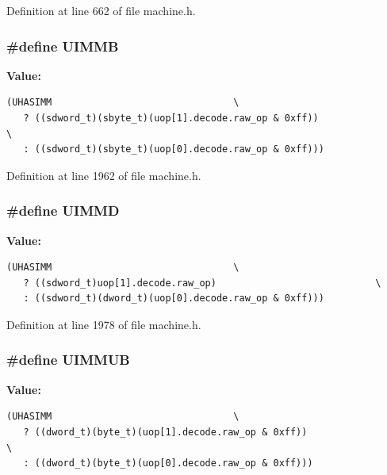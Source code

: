 Definition at line 662 of file machine.h.
\subsubsection[{UIMMB}]{\setlength{\rightskip}{0pt plus 5cm}\#define UIMMB}\label{machine_8h_27686bad12022aeba990da1a46f36e5a}


\textbf{Value:}

\begin{Code}\begin{verbatim}(UHASIMM                                \
   ? ((sdword_t)(sbyte_t)(uop[1].decode.raw_op & 0xff))                \
   : ((sdword_t)(sbyte_t)(uop[0].decode.raw_op & 0xff)))
\end{verbatim}
\end{Code}


Definition at line 1962 of file machine.h.
\subsubsection[{UIMMD}]{\setlength{\rightskip}{0pt plus 5cm}\#define UIMMD}\label{machine_8h_8a9a7eaecd779e8f7401f25b26a698ad}


\textbf{Value:}

\begin{Code}\begin{verbatim}(UHASIMM                                \
   ? ((sdword_t)uop[1].decode.raw_op)                            \
   : ((sdword_t)(dword_t)(uop[0].decode.raw_op & 0xff)))
\end{verbatim}
\end{Code}


Definition at line 1978 of file machine.h.
\subsubsection[{UIMMUB}]{\setlength{\rightskip}{0pt plus 5cm}\#define UIMMUB}\label{machine_8h_298f3ad34dbf1bdc826adf2713db9313}


\textbf{Value:}

\begin{Code}\begin{verbatim}(UHASIMM                                \
   ? ((dword_t)(byte_t)(uop[1].decode.raw_op & 0xff))                    \
   : ((dword_t)(byte_t)(uop[0].decode.raw_op & 0xff)))
\end{verbatim}
\end{Code}


